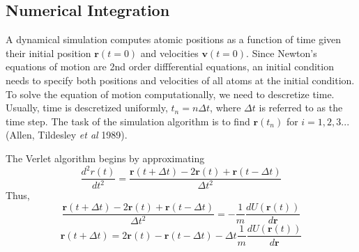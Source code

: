 \subsection{Numerical Integration}
A dynamical simulation computes atomic positions as a function of time given their initial position $\bm{r}(t=0)$ and velocities $\bm{v}(t=0)$.  Since Newton's equations of motion are 2nd order diffferential equations, an initial condition needs to specify both positions and velocities of all atoms at the initial condition.  To solve the equation of motion computationally, we need to descretize time.  Usually, time is descretized uniformly, $t_n=n\Delta t$, where $\Delta t$ is referred to as the time step.  The task of the simulation algorithm is to find $\bm{r}(t_n)$ for $i=1,2,3...$ (Allen, Tildesley \emph{et al} 1989).

The Verlet algorithm begins by approximating
\begin{equation}
	\frac{d^2 r(t)}
	     {dt^2}
	= \frac{\bm{r}(t+\Delta t) - 2\bm{r}(t) + \bm{r}(t-\Delta t)}
	       {\Delta t^2}
\end{equation}
Thus,
\begin{equation}
  \frac{\bm{r}(t+\Delta t) - 2\bm{r}(t) + \bm{r}(t-\Delta t)}
	     {\Delta t^2}
	=
	- \frac{1}{m} \frac{dU(\bm{r}(t))}{d\bm{r}}
\end{equation}
\begin{equation}
	\bm{r}(t+\Delta t)
	     = 2\bm{r}(t) - \bm{r}(t-\Delta t) - \Delta t \frac{1}{m} \frac{dU(\bm{r}(t))}{d\bm{r}}
\end{equation}


